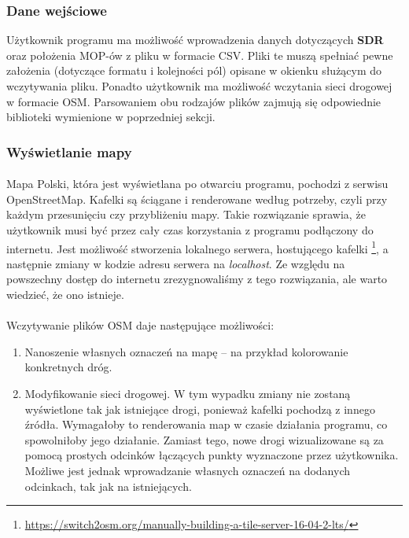 \subsubsection{Dane wejściowe}
Użytkownik programu ma możliwość wprowadzenia danych dotyczących \textbf{SDR}
oraz położenia MOP-ów z pliku w formacie CSV. Pliki te muszą spełniać pewne
założenia (dotyczące formatu i kolejności pól) opisane w okienku służącym do
wczytywania pliku. Ponadto użytkownik ma możliwość wczytania sieci drogowej w
formacie OSM. Parsowaniem obu rodzajów plików zajmują się odpowiednie
biblioteki wymienione w poprzedniej sekcji.
\subsubsection{Wyświetlanie mapy}
\paragraph{} 
Mapa Polski, która jest wyświetlana po otwarciu programu, pochodzi z
serwisu \mbox{OpenStreetMap}. Kafelki są ściągane i renderowane według potrzeby, czyli
przy każdym przesunięciu czy przybliżeniu mapy. Takie rozwiązanie sprawia, że
użytkownik musi być przez cały czas korzystania z programu podłączony
do internetu. Jest możliwość stworzenia lokalnego serwera, hostującego
kafelki
\footnote{\url{https://switch2osm.org/manually-building-a-tile-server-16-04-2-lts/}}, a
następnie zmiany w kodzie adresu serwera na \textit{localhost}. Ze względu na
powszechny dostęp do internetu zrezygnowaliśmy z tego rozwiązania, ale warto
wiedzieć, że ono istnieje. 
\paragraph{}
Wczytywanie plików OSM daje następujące możliwości:
\begin{enumerate}
  \item Nanoszenie własnych oznaczeń na mapę -- na przykład kolorowanie
    konkretnych dróg.
  \item Modyfikowanie sieci drogowej. W tym wypadku zmiany nie zostaną
    wyświetlone tak jak istniejące drogi, ponieważ kafelki pochodzą z innego
    źródła. Wymagałoby to renderowania map w czasie działania programu, co
    spowolniłoby jego działanie. Zamiast tego, nowe drogi wizualizowane są
    za pomocą prostych odcinków łączących punkty wyznaczone przez użytkownika. 
    Możliwe jest jednak wprowadzanie własnych oznaczeń na dodanych
    odcinkach, tak jak na istniejących. 
\end{enumerate}


